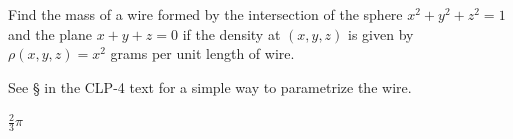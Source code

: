 \begin{solution}

\end{solution}

\begin{question}
Find the mass of a wire formed by the intersection of the
sphere $x^2+y^2+z^2=1$ and the plane $x+y+z=0$ if the density at $(x,y,z)$
is given by $\rho(x,y,z)=x^2$ grams per unit length of wire.
\end{question}

\begin{hint} 
See  \S{} in the CLP-4 text for a simple way to parametrize the wire.
\end{hint}

\begin{answer} 
$\tfrac{2}{3}\pi$
\end{answer}

